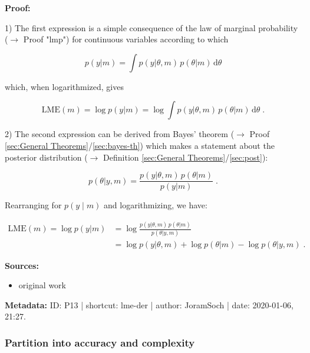 \documentclass[a4paper,12pt]{book}
\begin{document}
\vspace{1em}
\textbf{Proof:}

1) The first expression is a simple consequence of the law of marginal probability ($\rightarrow$ Proof "lmp") for continuous variables according to which

\begin{equation} \label{eq:lme-der-ME}
p(y|m) = \int p(y|\theta,m) \, p(\theta|m) \, \mathrm{d}\theta
\end{equation}

which, when logarithmized, gives

\begin{equation} \label{eq:lme-der-LME-marg-qed}
\mathrm{LME}(m) = \log p(y|m) = \log \int p(y|\theta,m) \, p(\theta|m) \, \mathrm{d}\theta \; .
\end{equation}

2) The second expression can be derived from Bayes' theorem ($\rightarrow$ Proof \ref{sec:General Theorems}/\ref{sec:bayes-th}) which makes a statement about the posterior distribution ($\rightarrow$ Definition \ref{sec:General Theorems}/\ref{sec:post}):

\begin{equation} \label{eq:lme-der-BT}
p(\theta|y,m) = \frac{p(y|\theta,m) \, p(\theta|m)}{p(y|m)} \; .
\end{equation}

Rearranging for $p(y \mid m)$ and logarithmizing, we have:

\begin{equation} \label{eq:lme-der-LME-bayes-qed}
\begin{split}
\mathrm{LME}(m) = \log p(y|m) & = \log \frac{p(y|\theta,m) \, p(\theta|m)}{p(\theta|y,m)} \\
&= \log p(y|\theta,m) + \log p(\theta|m) - \log p(\theta|y,m) \; .
\end{split}
\end{equation}

\vspace{1em}
\textbf{Sources:}
\begin{itemize}
\item original work\end{itemize}


\vspace{1em}
\textbf{Metadata:} ID: P13 | shortcut: lme-der | author: JoramSoch | date: 2020-01-06, 21:27.


\subsubsection[\textbf{Partition into accuracy and complexity}]{Partition into accuracy and complexity} \label{sec:lme-anc}
\end{document}
